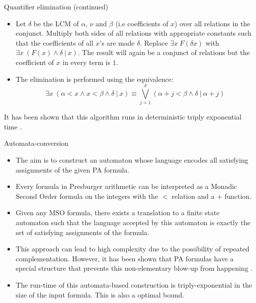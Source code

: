 \documentclass[10pt]{beamer}
\begin{document}
\begin{frame}{Quantifier elimination (continued)}
    \begin{itemize}
        \item Let $\delta$ be the LCM of $\alpha$, $\nu$ and $\beta$ (i.e coefficients of $x$) over all relations in the conjunct. 
        Multiply both sides of all relations with appropriate constants such that the coefficients of all $x$'s are made $\delta$.
        Replace $\exists x\: F(\delta x)$ with $\exists x\: (F(x)\wedge \delta\:|\: x)$. The result will again be a conjunct of 
        relations but the coefficient of $x$ in every term is $1$.
        \item The elimination is performed using the equivalence:
        \[ \exists x \:(\alpha<x\wedge  x<\beta \wedge  \delta\: |\: x) \equiv \bigvee_{j=1}^{\delta} (\alpha+j<\beta \wedge \delta\:|\:\alpha+j) \] 
    \end{itemize}
    It has been shown that this algorithm runs in deterministic triply exponential time \cite{oppen1978222pn}.
\end{frame}
\begin{frame}{Automata-conversion}
    \begin{itemize}
        \item The aim is to construct an automaton whose language encodes all satisfying assignments of the given PA formula.
        \item Every formula in Presburger arithmetic can be interpreted as a Monadic Second Order formula on the integers with the $<$ relation
        and a $+$ function.
        \item Given any MSO formula, there exists a translation to a finite state automaton 
        such that the language accepted by this automaton is exactly the set of satisfying assignments of the formula.
        \item This approach can lead to high complexity due to the possibility of repeated complementation. 
        However, it has been shown that PA formulas have a special structure that prevents this non-elementary blow-up from happening \cite{durand2010use}.
        \item The run-time of this automata-based construction is triply-exponential in the size of the input formula. 
        This is also a optimal bound. 
    \end{itemize}
\end{frame}
\end{document}
